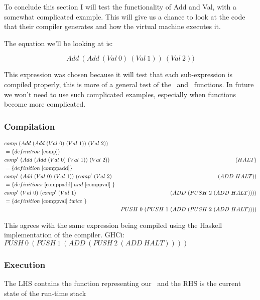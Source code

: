 \documentclass {article}
\begin{document}
To conclude this section I will test the functionality
of Add and Val, with a somewhat complicated
example.
This will give us a chance to look at the code that their
compiler generates and how the virtual machine executes it.

The equation we'll be looking at is:

\[ Add\ (Add\ (Val\ 0)\ (Val\ 1))\ (Val\ 2)) \]

This expression was chosen because it 
will test that each sub-expression
is compiled properly, 
this is more of a general test of the
\comp\ and \compp\ functions. 
In future we won't need to use
such complicated examples, 
especially when functions become more complicated.

\subsubsection{Compilation}

\begin{align*}
&comp\ (Add\ (Add\ (Val\ 0)\ (Val\ 1))\ (Val\ 2)) \\
&= \{ definition\ \ref{comp} \} \\
&comp'\ (Add\ (Add\ (Val\ 0)\ (Val\ 1))\ (Val\ 2))\ 			&(HALT) \\
&= \{ definition\ \ref{comppadd} \} \\
&comp'\ (Add\ (Val\ 0)\ (Val\ 1))\ (comp'\ (Val\ 2) 	  &(ADD\ HALT)) \\
&= \{ definitions\ \ref{comppadd}\ and\ \ref{comppval} \ \} \\
&comp'\ (Val\ 0)\ (comp'\ (Val\ 1)\		&(ADD\ (PUSH\ 2\ (ADD\ HALT)))) \\
&= \{ definition\ \ref{comppval}\ twice \ \} \\
&					 &PUSH\ 0\ (PUSH\ 1\ (ADD\ (PUSH\ 2\ (ADD\ HALT)))) \\
\end{align*}

This agrees with the same expression being compiled
using the Haskell implementation of the compiler.
GHCi: \( PUSH\ 0\ (PUSH\ 1\ (ADD\ (PUSH\ 2\ (ADD\ HALT)))) \)

\subsubsection{Execution}

The LHS contains the function representing our \vm\
and the RHS is the current state of the run-time stack
\end{document}
